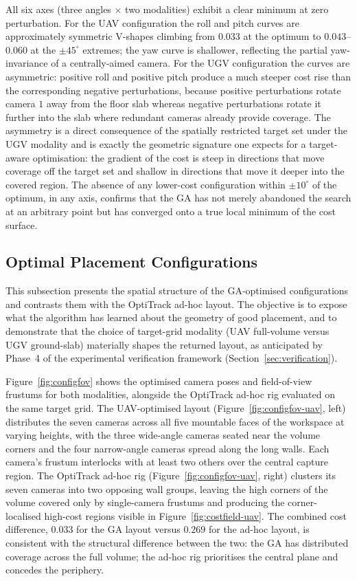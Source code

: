 All six axes (three angles $\times$ two modalities) exhibit a clear minimum at zero perturbation. For the UAV configuration the roll and pitch curves are approximately symmetric V-shapes climbing from $0.033$ at the optimum to $0.043$--$0.060$ at the $\pm 45^\circ$ extremes; the yaw curve is shallower, reflecting the partial yaw-invariance of a centrally-aimed camera. For the UGV configuration the curves are asymmetric: positive roll and positive pitch produce a much steeper cost rise than the corresponding negative perturbations, because positive perturbations rotate camera $1$ away from the floor slab whereas negative perturbations rotate it further into the slab where redundant cameras already provide coverage. The asymmetry is a direct consequence of the spatially restricted target set under the UGV modality and is exactly the geometric signature one expects for a target-aware optimisation: the gradient of the cost is steep in directions that move coverage off the target set and shallow in directions that move it deeper into the covered region. The absence of any lower-cost configuration within $\pm 10^\circ$ of the optimum, in any axis, confirms that the GA has not merely abandoned the search at an arbitrary point but has converged onto a true local minimum of the cost surface.

\subsection{Optimal Placement Configurations}
\label{sec:sim-optconfig}

This subsection presents the spatial structure of the GA-optimised configurations and contrasts them with the OptiTrack ad-hoc layout. The objective is to expose what the algorithm has learned about the geometry of good placement, and to demonstrate that the choice of target-grid modality (UAV full-volume versus UGV ground-slab) materially shapes the returned layout, as anticipated by Phase~4 of the experimental verification framework (Section~\ref{sec:verification}).

Figure~\ref{fig:configfov} shows the optimised camera poses and field-of-view frustums for both modalities, alongside the OptiTrack ad-hoc rig evaluated on the same target grid. The UAV-optimised layout (Figure~\ref{fig:configfov-uav}, left) distributes the seven cameras across all five mountable faces of the workspace at varying heights, with the three wide-angle cameras seated near the volume corners and the four narrow-angle cameras spread along the long walls. Each camera's frustum interlocks with at least two others over the central capture region. The OptiTrack ad-hoc rig (Figure~\ref{fig:configfov-uav}, right) clusters its seven cameras into two opposing wall groups, leaving the high corners of the volume covered only by single-camera frustums and producing the corner-localised high-cost regions visible in Figure~\ref{fig:costfield-uav}. The combined cost difference, $0.033$ for the GA layout versus $0.269$ for the ad-hoc layout, is consistent with the structural difference between the two: the GA has distributed coverage across the full volume; the ad-hoc rig prioritises the central plane and concedes the periphery.


